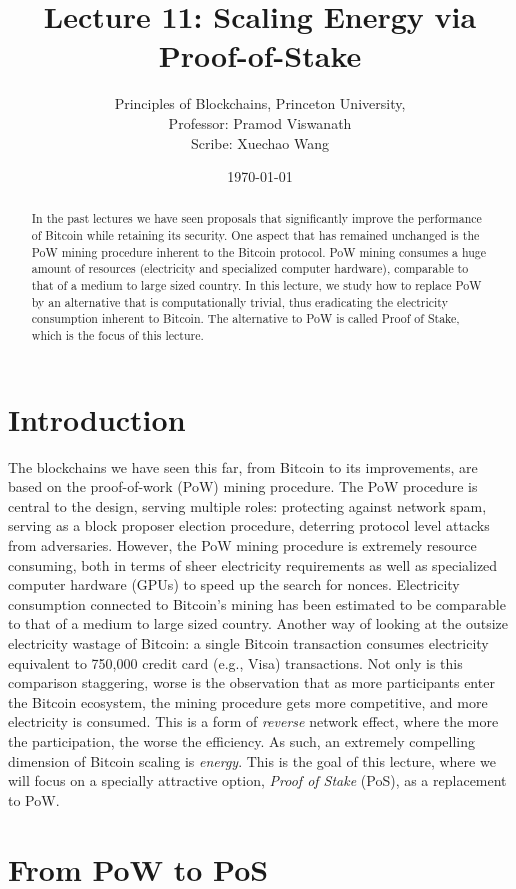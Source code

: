 \documentclass{article}
\title{Lecture 11:  Scaling Energy via Proof-of-Stake}
\author{Principles of Blockchains, Princeton University,  \\ Professor:  Pramod Viswanath \\ Scribe:  Xuechao Wang}
\date{\today}
\begin{document}
\maketitle

\begin{abstract}
In the past lectures we have seen proposals that significantly improve the performance of Bitcoin while retaining its security. One aspect that has remained unchanged is the PoW mining procedure inherent to the Bitcoin protocol. PoW mining consumes a huge amount of resources (electricity and specialized computer hardware), comparable to that of a medium to large sized country. In this lecture, we study how to replace PoW by an alternative that is computationally trivial, thus eradicating  the electricity consumption inherent to Bitcoin. The alternative to PoW is called Proof of Stake, which is the focus of this lecture. 
\end{abstract}


\section*{Introduction}
The blockchains we have seen this far, from Bitcoin to its improvements, are based on the proof-of-work (PoW) mining procedure. The PoW procedure is central to the design, serving multiple roles: protecting against network spam, serving as a block proposer election procedure, deterring protocol level attacks from adversaries. However, the PoW mining procedure is extremely resource consuming, both in terms of sheer electricity requirements as well as specialized computer hardware (GPUs) to speed up the search for nonces. Electricity consumption connected to Bitcoin's mining has been estimated to be comparable to that of a medium to large sized country. Another way of looking at the outsize electricity wastage of Bitcoin: a single Bitcoin transaction consumes electricity equivalent to 750,000 credit card (e.g., Visa) transactions. Not only is this comparison staggering, worse is the observation that as more participants enter the Bitcoin ecosystem, the mining procedure gets more competitive, and more electricity is consumed. This is a form of {\em reverse} network effect, where the more the participation, the worse the efficiency. As such, an extremely compelling dimension of Bitcoin scaling is {\em energy}. This is the goal of this lecture, where we will focus on a specially attractive option, {\em Proof of Stake} (PoS), as a replacement to PoW. 

\section*{From PoW to PoS}
\end{document}

